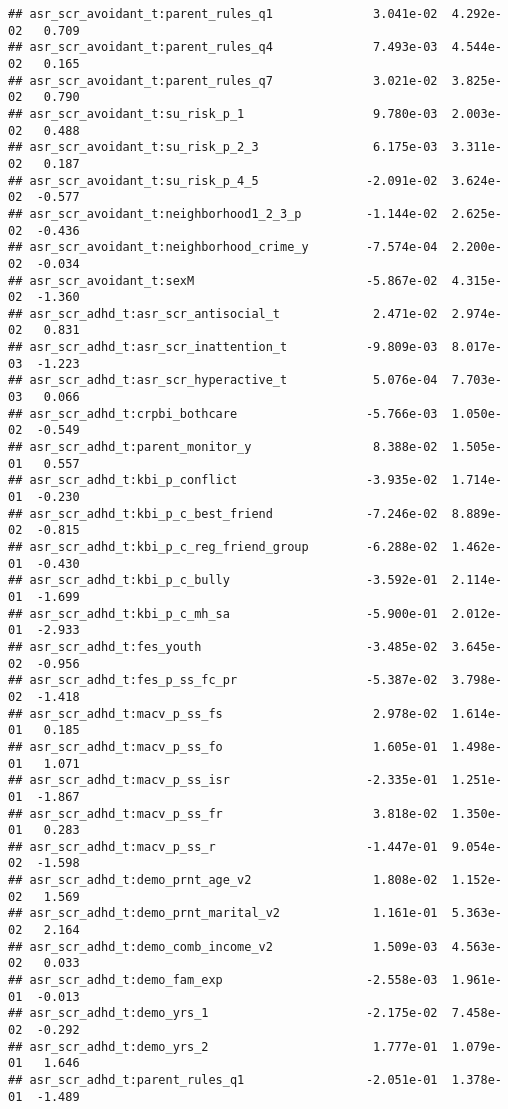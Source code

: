 \documentclass[
]{article}
\begin{document}
\begin{verbatim}
## asr_scr_avoidant_t:parent_rules_q1              3.041e-02  4.292e-02   0.709
## asr_scr_avoidant_t:parent_rules_q4              7.493e-03  4.544e-02   0.165
## asr_scr_avoidant_t:parent_rules_q7              3.021e-02  3.825e-02   0.790
## asr_scr_avoidant_t:su_risk_p_1                  9.780e-03  2.003e-02   0.488
## asr_scr_avoidant_t:su_risk_p_2_3                6.175e-03  3.311e-02   0.187
## asr_scr_avoidant_t:su_risk_p_4_5               -2.091e-02  3.624e-02  -0.577
## asr_scr_avoidant_t:neighborhood1_2_3_p         -1.144e-02  2.625e-02  -0.436
## asr_scr_avoidant_t:neighborhood_crime_y        -7.574e-04  2.200e-02  -0.034
## asr_scr_avoidant_t:sexM                        -5.867e-02  4.315e-02  -1.360
## asr_scr_adhd_t:asr_scr_antisocial_t             2.471e-02  2.974e-02   0.831
## asr_scr_adhd_t:asr_scr_inattention_t           -9.809e-03  8.017e-03  -1.223
## asr_scr_adhd_t:asr_scr_hyperactive_t            5.076e-04  7.703e-03   0.066
## asr_scr_adhd_t:crpbi_bothcare                  -5.766e-03  1.050e-02  -0.549
## asr_scr_adhd_t:parent_monitor_y                 8.388e-02  1.505e-01   0.557
## asr_scr_adhd_t:kbi_p_conflict                  -3.935e-02  1.714e-01  -0.230
## asr_scr_adhd_t:kbi_p_c_best_friend             -7.246e-02  8.889e-02  -0.815
## asr_scr_adhd_t:kbi_p_c_reg_friend_group        -6.288e-02  1.462e-01  -0.430
## asr_scr_adhd_t:kbi_p_c_bully                   -3.592e-01  2.114e-01  -1.699
## asr_scr_adhd_t:kbi_p_c_mh_sa                   -5.900e-01  2.012e-01  -2.933
## asr_scr_adhd_t:fes_youth                       -3.485e-02  3.645e-02  -0.956
## asr_scr_adhd_t:fes_p_ss_fc_pr                  -5.387e-02  3.798e-02  -1.418
## asr_scr_adhd_t:macv_p_ss_fs                     2.978e-02  1.614e-01   0.185
## asr_scr_adhd_t:macv_p_ss_fo                     1.605e-01  1.498e-01   1.071
## asr_scr_adhd_t:macv_p_ss_isr                   -2.335e-01  1.251e-01  -1.867
## asr_scr_adhd_t:macv_p_ss_fr                     3.818e-02  1.350e-01   0.283
## asr_scr_adhd_t:macv_p_ss_r                     -1.447e-01  9.054e-02  -1.598
## asr_scr_adhd_t:demo_prnt_age_v2                 1.808e-02  1.152e-02   1.569
## asr_scr_adhd_t:demo_prnt_marital_v2             1.161e-01  5.363e-02   2.164
## asr_scr_adhd_t:demo_comb_income_v2              1.509e-03  4.563e-02   0.033
## asr_scr_adhd_t:demo_fam_exp                    -2.558e-03  1.961e-01  -0.013
## asr_scr_adhd_t:demo_yrs_1                      -2.175e-02  7.458e-02  -0.292
## asr_scr_adhd_t:demo_yrs_2                       1.777e-01  1.079e-01   1.646
## asr_scr_adhd_t:parent_rules_q1                 -2.051e-01  1.378e-01  -1.489

\end{verbatim}
\end{document}
